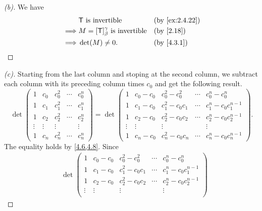 \begin{proof}[(b)]
	We have
	\begin{align*}
		         & \T \text{ is invertible}                        &  & \by{ex:2.4.22} \\
		\implies & M = [\T]_{\beta}^{\gamma} \text{ is invertible} &  & \by{2.18}      \\
		\implies & \det(M) \neq 0.                                 &  & \by{4.3.1}
	\end{align*}
\end{proof}

\begin{proof}[(c)]
	Starting from the last column and stoping at the second column, we subtract each column with its preceding column times \(c_0\) and get the following result.
	\[
		\det\begin{pmatrix}
			1      & c_0    & c_0^2  & \cdots & c_0^n  \\
			1      & c_1    & c_1^2  & \cdots & c_1^n  \\
			1      & c_2    & c_2^2  & \cdots & c_2^n  \\
			\vdots & \vdots & \vdots &        & \vdots \\
			1      & c_n    & c_n^2  & \cdots & c_n^n
		\end{pmatrix} = \det\begin{pmatrix}
			1      & c_0 - c_0 & c_0^2 - c_0^2   & \cdots & c_0^n - c_0^n           \\
			1      & c_1 - c_0 & c_1^2 - c_0 c_1 & \cdots & c_1^n - c_0 c_1^{n - 1} \\
			1      & c_2 - c_0 & c_2^2 - c_0 c_2 & \cdots & c_2^n - c_0 c_2^{n - 1} \\
			\vdots & \vdots    & \vdots          &        & \vdots                  \\
			1      & c_n - c_0 & c_n^2 - c_0 c_n & \cdots & c_n^n - c_0 c_n^{n - 1}
		\end{pmatrix}.
	\]
	The equality holds by \cref{4.6,4.8}.
	Since
	\begin{align*}
		 & \det\begin{pmatrix}
			       1      & c_0 - c_0 & c_0^2 - c_0^2   & \cdots & c_0^n - c_0^n           \\
			       1      & c_1 - c_0 & c_1^2 - c_0 c_1 & \cdots & c_1^n - c_0 c_1^{n - 1} \\
			       1      & c_2 - c_0 & c_2^2 - c_0 c_2 & \cdots & c_2^n - c_0 c_2^{n - 1} \\
			       \vdots & \vdots    & \vdots          &        & \vdots                  \\

\end{pmatrix}
\end{align*}
\end{proof}
